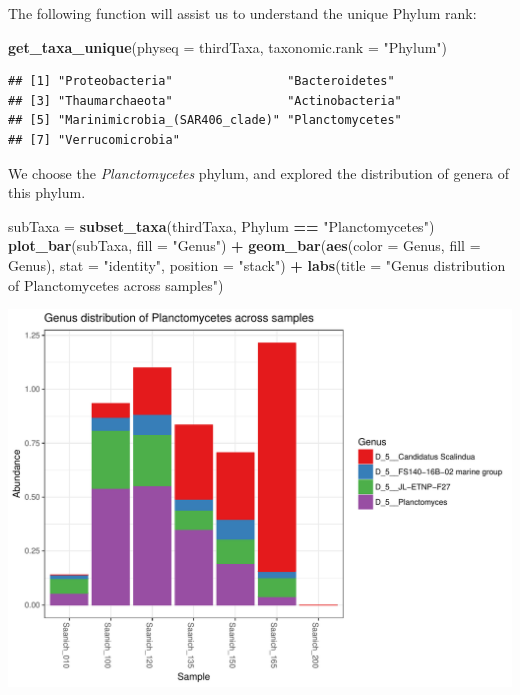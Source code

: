\documentclass[11 pt,]{article}
\newenvironment{Shaded}{\begin{snugshade}}{\end{snugshade}}
\newcommand{\KeywordTok}[1]{\textcolor[rgb]{0.13,0.29,0.53}{\textbf{#1}}}
\newcommand{\DataTypeTok}[1]{\textcolor[rgb]{0.13,0.29,0.53}{#1}}
\newcommand{\StringTok}[1]{\textcolor[rgb]{0.31,0.60,0.02}{#1}}
\newcommand{\OperatorTok}[1]{\textcolor[rgb]{0.81,0.36,0.00}{\textbf{#1}}}
\newcommand{\NormalTok}[1]{#1}
\begin{document}
The following function will assist us to understand the unique Phylum
rank:

\begin{Shaded}
\begin{Highlighting}[]
\KeywordTok{get_taxa_unique}\NormalTok{(}\DataTypeTok{physeq =}\NormalTok{ thirdTaxa, }\DataTypeTok{taxonomic.rank =} \StringTok{"Phylum"}\NormalTok{)}
\end{Highlighting}
\end{Shaded}

\begin{verbatim}
## [1] "Proteobacteria"                "Bacteroidetes"                
## [3] "Thaumarchaeota"                "Actinobacteria"               
## [5] "Marinimicrobia_(SAR406_clade)" "Planctomycetes"               
## [7] "Verrucomicrobia"
\end{verbatim}

We choose the \emph{Planctomycetes} phylum, and explored the
distribution of genera of this phylum.

\begin{Shaded}
\begin{Highlighting}[]
\NormalTok{subTaxa =}\StringTok{ }\KeywordTok{subset_taxa}\NormalTok{(thirdTaxa, Phylum }\OperatorTok{==}\StringTok{ "Planctomycetes"}\NormalTok{)}
\KeywordTok{plot_bar}\NormalTok{(subTaxa, }\DataTypeTok{fill =} \StringTok{"Genus"}\NormalTok{) }\OperatorTok{+}\StringTok{ }\KeywordTok{geom_bar}\NormalTok{(}\KeywordTok{aes}\NormalTok{(}\DataTypeTok{color =}\NormalTok{ Genus, }\DataTypeTok{fill =}\NormalTok{ Genus), }
    \DataTypeTok{stat =} \StringTok{"identity"}\NormalTok{, }\DataTypeTok{position =} \StringTok{"stack"}\NormalTok{) }\OperatorTok{+}\StringTok{ }\KeywordTok{labs}\NormalTok{(}\DataTypeTok{title =} \StringTok{"Genus distribution of Planctomycetes across samples"}\NormalTok{)}
\end{Highlighting}
\end{Shaded}

\includegraphics{Figs/unnamed-chunk-9-1.pdf}
\end{document}
